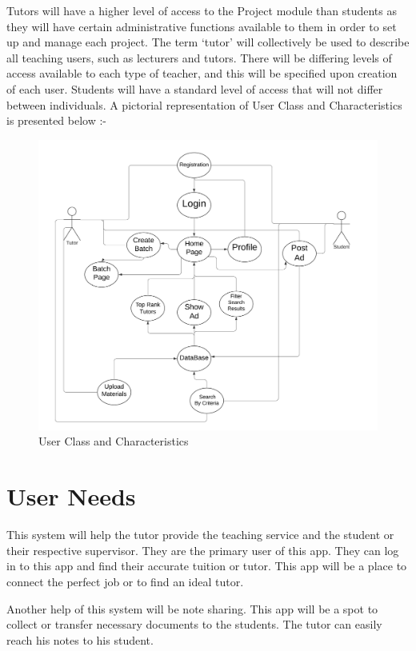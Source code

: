 Tutors will have a higher level of access to the Project module than students as they will have
certain administrative functions available to them in order to set up and manage each project.
The term ‘tutor’ will collectively be used to describe all teaching users, such as lecturers and tutors.
There will be differing levels of access available to each type of teacher, and this will be specified upon
creation of each user.
Students will have a standard level of access that will not differ between individuals. A pictorial representation of User Class and Characteristics is presented below :-

\begin{figure}[ht]
    \centering
    \includegraphics[width=15cm]{images/user_class_diagram.png}
    \caption{User Class and Characteristics}
    \label{fig:User class and Characteristics}
\end{figure}
\section{User Needs}
This system will help the tutor provide the teaching service and the student or their respective supervisor. They are the primary user of this app. They can log in to this app and find their accurate tuition or tutor. This app will be a place to connect the perfect job or to find an ideal tutor. 

Another help of this system will be note sharing. This app will be a spot to collect or transfer necessary documents to the students. The tutor can easily reach his notes to his student. 

